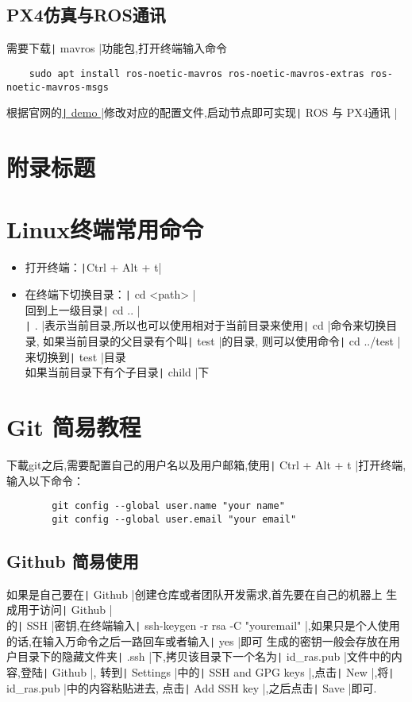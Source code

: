 \documentclass{article}
\newcommand\mintbash[1]{\texttt| #1 |}
\newcommand\bash[1]{\texttt| #1 |}
\begin{document}
\subsection{PX4仿真与ROS通讯}
需要下载\mintbash{mavros}功能包,打开终端输入命令
\begin{verbatim}
    sudo apt install ros-noetic-mavros ros-noetic-mavros-extras ros-noetic-mavros-msgs
\end{verbatim}
根据官网的\href{https://docs.px4.io/main/en/ros/mavros_offboard_cpp.html}{\bash{demo}}修改对应的配置文件,启动节点即可实现\bash{ROS 与 PX4通讯}
\begin{appendices}
    \renewcommand{\thesection}{\Alph{section}}
    \section{附录标题}
    \section{Linux终端常用命令}
    \begin{itemize}
        \item 打开终端：\texttt|Ctrl + Alt + t|
        \item 在终端下切换目录：\texttt| cd <path> |\\
              回到上一级目录\texttt| cd .. |\\
              \texttt| . |表示当前目录,所以也可以使用相对于当前目录来使用\texttt| cd |命令来切换目录,
              如果当前目录的父目录有个叫\texttt| test |的目录,
              则可以使用命令\texttt| cd ../test |来切换到\texttt| test |目录\\
              如果当前目录下有个子目录\texttt| child |下
    \end{itemize}
    \section{Git 简易教程}
    下載git之后,需要配置自己的用户名以及用户邮箱,使用\texttt| Ctrl + Alt + t |打开终端,输入以下命令：
    \begin{verbatim}
        git config --global user.name "your name"
        git config --global user.email "your email"
    \end{verbatim}
    \subsection{Github 简易使用}
    如果是自己要在\mintbash{Github}创建仓库或者团队开发需求,首先要在自己的机器上
    生成用于访问\mintbash{Github}\\的\mintbash{SSH}密钥,在终端输入\mintbash{ssh-keygen -r rsa -C "youremail"},如果只是个人使用的话,在输入万命令之后一路回车或者输入\mintbash{yes}即可
    生成的密钥一般会存放在用户目录下的隐藏文件夹\mintbash{.ssh}下,拷贝该目录下一个名为\mintbash{id_ras.pub}文件中的内容,登陆\mintbash{Github},
    转到\mintbash{Settings}中的\mintbash{SSH and GPG keys},点击\mintbash{New},将\mintbash{id_ras.pub}中的内容粘贴进去,
    点击\mintbash{Add SSH key},之后点击\mintbash{Save}即可.

\end{appendices}
\end{document}
